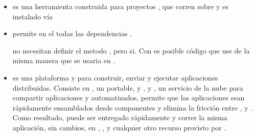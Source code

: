	\begin{itemize}
		\item
			\textbf{\grunttoolNAME} es una herramienta \commandLine \taskBased construida para proyectos \javaScriptNAME, que corren sobre \nodejsNAME y es instalado vía \npm \cite{technology_gruntjs}

		\item
			\textbf{\browserifyNAME} permite \requireINT \modulesAS en el \browsersINT \bundlingUpCPT todas las dependencias \cite{online_official_website_browserify}.

			\browsersINT no necesitan definir el metodo \requestINT, pero \nodejsNAME si. Con \browserifyNAME es posible \writeCPT código que use \requireINT de la misma manera que se usaria en \nodejsNAME  \cite{online_official_website_browserify}.

		\item
			\textbf{\dockerNAME} es una plataforma \openSourcePC y \sysadmins para construir, enviar y ejecutar aplicaciones distribuidas. Consiste en \dockerNAME \engine, un portable, \lightweightPL \runtimeCPT y \packagingCPT \tool, y \dockerNAME \hub, un servicio de la nube para compartir aplicaciones y \workflowsCPT automatizados, \dockerNAME permite que las aplicaciones sean rápidamente ensamblados desde componentes y elimina la fricción entre \developmentPC, \qaSIGLA y \productionPC \environmentsPL. Como resultado, puede ser entregado rápidamente y correr la misma aplicación, sin cambios, en \laptops, \dataPC \centerCustom \vmsSIGLA, y cualquier otro recurso provisto por \internet \cite{technology_docker}.


\end{itemize}
